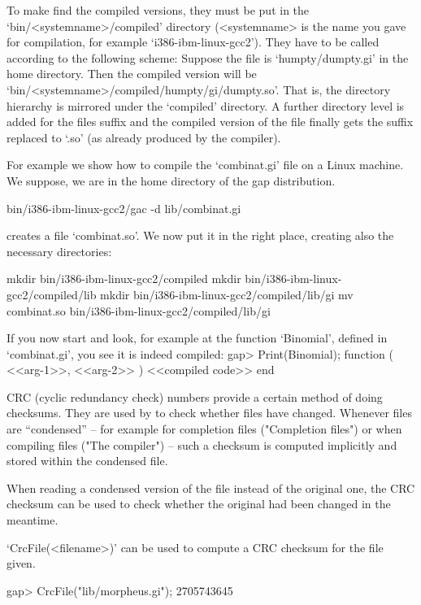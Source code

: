 To make {\GAP} find the compiled versions, they must be
put in the `bin/<systemname>/compiled' directory (<systemname> is the name
you gave for compilation, for example `i386-ibm-linux-gcc2'). They have
to be called according to the following scheme: 
Suppose the file is `humpty/dumpty.gi' in the {\GAP} home
directory. Then the compiled version will be
`bin/<systemname>/compiled/humpty/gi/dumpty.so'. That is, the directory
hierarchy is mirrored under the `compiled' directory. A further directory
level is added for the files suffix and the compiled version of the file
finally gets the suffix replaced to `.so' (as already produced by the
compiler).

For example we show how
to compile the `combinat.gi' file on a Linux machine. We suppose, we are in
the home directory of the gap distribution.

\begintt
bin/i386-ibm-linux-gcc2/gac -d lib/combinat.gi
\endtt

creates a file `combinat.so'. We now put it in the right place, creating
also the necessary directories:

\begintt
mkdir bin/i386-ibm-linux-gcc2/compiled
mkdir bin/i386-ibm-linux-gcc2/compiled/lib
mkdir bin/i386-ibm-linux-gcc2/compiled/lib/gi
mv combinat.so bin/i386-ibm-linux-gcc2/compiled/lib/gi
\endtt

If you now start {\GAP} and look, for example at the function `Binomial',
defined in `combinat.gi', you see it is indeed compiled:
\begintt
gap> Print(Binomial);
function ( <<arg-1>>, <<arg-2>> )
    <<compiled code>>
end
\endtt


CRC (cyclic redundancy check) numbers provide a certain method of doing
checksums. They are used by {\GAP} to check whether
files have changed.
Whenever files are ``condensed'' -- for example for completion files
("Completion files") or when compiling files ("The compiler") -- such a
checksum is computed implicitly and stored within the condensed file.

When reading a condensed version of the file instead of the original one,
the CRC checksum can be used to check whether the original had been changed
in the meantime.

`CrcFile(<filename>)' can be used to compute a CRC checksum for the file
given.

\begintt
gap> CrcFile("lib/morpheus.gi");
2705743645
\endtt

